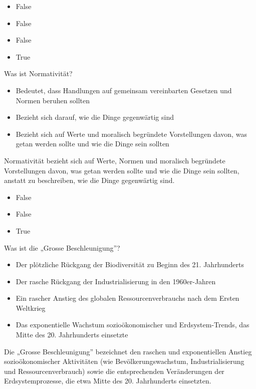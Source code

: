 \documentclass[
  nswissgerman,
  a4paper,
  DIV=11,
  numbers=noendperiod,
  oneside,
  openany]{scrreprt}
\providecommand{\tightlist}{%
  \setlength{\itemsep}{0pt}\setlength{\parskip}{0pt}}
\begin{document}
\begin{itemize}
\tightlist
\item
  False
\item
  False
\item
  False
\item
  True
\end{itemize}

Was ist Normativität?

\begin{itemize}
\tightlist
\item[$\square$]
  Bedeutet, dass Handlungen auf gemeinsam vereinbarten Gesetzen und
  Normen beruhen sollten
\item[$\square$]
  Bezieht sich darauf, wie die Dinge gegenwärtig sind
\item[$\square$]
  Bezieht sich auf Werte und moralisch begründete Vorstellungen davon,
  was getan werden sollte und wie die Dinge sein sollten
\end{itemize}

Normativität bezieht sich auf Werte, Normen und moralisch begründete
Vorstellungen davon, was getan werden sollte und wie die Dinge sein
sollten, anstatt zu beschreiben, wie die Dinge gegenwärtig sind.

\begin{itemize}
\tightlist
\item
  False
\item
  False
\item
  True
\end{itemize}

Was ist die „Grosse Beschleunigung''?

\begin{itemize}
\tightlist
\item[$\square$]
  Der plötzliche Rückgang der Biodiversität zu Beginn des 21.
  Jahrhunderts
\item[$\square$]
  Der rasche Rückgang der Industrialisierung in den 1960er-Jahren
\item[$\square$]
  Ein rascher Anstieg des globalen Ressourcenverbrauchs nach dem Ersten
  Weltkrieg
\item[$\square$]
  Das exponentielle Wachstum sozioökonomischer und Erdsystem-Trends, das
  Mitte des 20. Jahrhunderts einsetzte
\end{itemize}

Die „Grosse Beschleunigung'' bezeichnet den raschen und exponentiellen
Anstieg sozioökonomischer Aktivitäten (wie Bevölkerungswachstum,
Industrialisierung und Ressourcenverbrauch) sowie die entsprechenden
Veränderungen der Erdsystemprozesse, die etwa Mitte des 20. Jahrhunderts
einsetzten.
\end{document}
